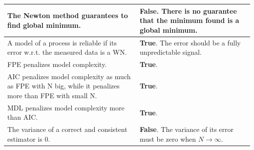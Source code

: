 \documentclass[10pt,a4paper]{article}
\begin{document}
\begin{center}
\begin{tabular}{ | m{200pt} | m{200pt}| }
    \\ \hline
    The Newton method guarantees to find global minimum. & \textbf{False}. There is no guarantee that the minimum found is a global minimum. 
    \\ \hline
    A model of a process is reliable if its error w.r.t. the measured data is a WN. & \textbf{True}. The error should be a fully unpredictable signal.
    \\ \hline
    FPE penalizes model complexity. & \textbf{True}.
    \\ \hline
    AIC penalizes model complexity as much as FPE with N big, while it penalizes more than FPE with small N. & \textbf{True}.
    \\ \hline
    MDL penalizes model complexity more than AIC. & \textbf{True}.
    \\ \hline
    The variance of a correct and consistent estimator is 0. & \textbf{False}. The variance of its error must be zero when $N \rightarrow \infty$.
    \\ \hline
\end{tabular}
\end{center}
\end{document}
